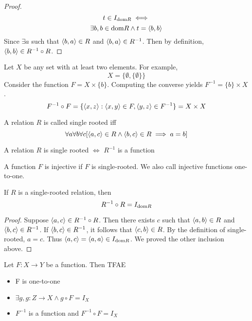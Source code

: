 \begin{proof}
\[t \in I_{\text{dom} R} \iff\]
\[\exists b, b \in \text{dom} R \wedge t = \langle b, b\rangle\]
Since $\exists a$ such  that $\langle b, a\rangle \in R$ and $\langle b, a\rangle \in R^{-1}$.
Then by definition, $\langle b, b\rangle \in R^{-1} \circ R$.
\end{proof}
\begin{ex}
Let $X$ be any set with at least two elements. For example,
\[X = \{\emptyset, \{\emptyset\}\}\]
Consider the function $F = X \times \{b\}$. Computing the converse yields
$F^{-1} = \{b\} \times X$.
\[F^{-1} \circ F = \{\langle x, z\rangle: \langle x, y\rangle \in F, \langle y, z\rangle \in F^{-1}\} = X \times X\]
\end{ex}
\begin{defn}
A relation $R$ is called single rooted iff 
\[\forall a \forall b \forall c[\langle a, c\rangle \in R \wedge \langle b, c\rangle \in R \implies a = b]\]
\end{defn}
\begin{rem}
A relation $R$ is single rooted $\iff$ $R^{-1}$ is a function
\end{rem}
\begin{defn}[Injective]
A function $F$ is injective if $F$ is single-rooted. We also call injective functions one-to-one.
\end{defn}
\begin{prop}
If $R$ is a single-rooted relation, then 
\[R^{-1} \circ R = I_{\text{dom} R}\]
\end{prop}
\begin{proof}
Suppose $\langle a, c\rangle \in R^{-1}\circ R$. Then there exists $c$ such that
$\langle a, b\rangle \in R$ and $\langle b, c\rangle \in R^{-1}$. If $\langle b, c\rangle \in R^{-1}$,
it follows that $\langle c, b\rangle \in R$. By the definition of single-rooted, $a = c$. Thus
$\langle a, c\rangle = \langle a, a\rangle \in I_{\text{dom} R}$. We proved the other inclusion above.
\end{proof}
\begin{thm}[1-1 Functions]
    Let $F: X \to Y$ be a function. Then TFAE
    \begin{itemize}
        \item F is one-to-one
        \item $\exists g, g: Z \to X \wedge g \circ F = I_X$
        \item $F^{-1}$ is a function and $F^{-1}\circ F = I_X$
    \end{itemize}
\end{thm}
